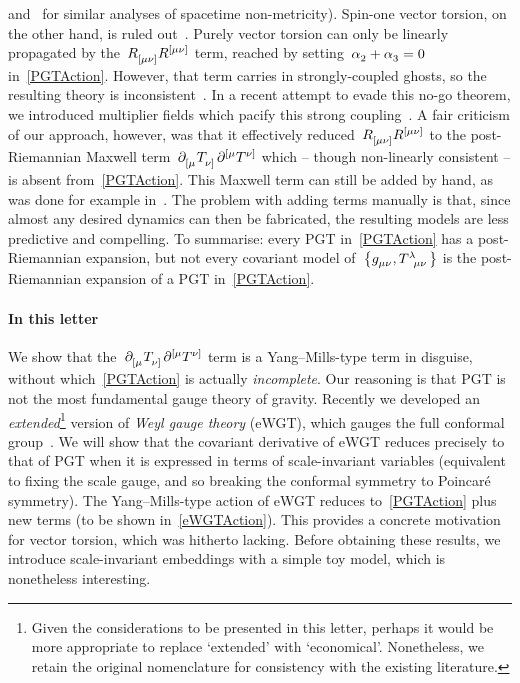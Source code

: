 \documentclass[aps,prd,reprint,preprintnumbers,showpacs,floatfix,nofootinbib,superscript address]{revtex4-2}
\begin{document}
and~\cite{BeltranJimenez:2019acz,BeltranJimenez:2019esp,Percacci:2020ddy,BeltranJimenez:2020sqf,Marzo:2021esg,Piva:2021nyj,Marzo:2021iok,Iosifidis:2021xdx,Jimenez-Cano:2022sds,Iosifidis:2023pvz} for similar analyses of spacetime non-metricity). Spin-one vector torsion, on the other hand, is ruled out~\cite{Yo:1999ex,Yo:2001sy}. Purely vector torsion can only be linearly propagated by the~$\MAGF{_{[\mu\nu]}}\MAGF{^{[\mu\nu]}}$ term, reached by setting~$\Alp{2}+\Alp{3}=0$ in~\cref{PGTAction}. However, that term carries in strongly-coupled ghosts, so the resulting theory is inconsistent~\cite{Yo:1999ex,Yo:2001sy}. In a recent attempt to evade this no-go theorem, we introduced multiplier fields which pacify this strong coupling~\cite{Barker:2023fem}. A fair criticism of our approach, however, was that it effectively reduced~$\MAGF{_{[\mu\nu]}}\MAGF{^{[\mu\nu]}}$ to the post-Riemannian Maxwell term~$\PD{_{[\mu}}\MAGT{_{\nu]}}\PD{^{[\mu}}\MAGT{^{\nu]}}$ which -- though non-linearly consistent -- is absent from~\cref{PGTAction}. This Maxwell term can still be added by hand, as was done for example in~\cite{Mikura:2023ruz}. The problem with adding terms manually is that, since almost any desired dynamics can then be fabricated, the resulting models are less predictive and compelling. To summarise: every PGT in~\cref{PGTAction} has a post-Riemannian expansion, but not every covariant model of~$\big\{\FieldG{_{\mu\nu}},\MAGT{^\lambda_{\mu\nu}}\big\}$ is the post-Riemannian expansion of a PGT in~\cref{PGTAction}.


\paragraph*{In this letter} We show that the~$\PD{_{[\mu}}\MAGT{_{\nu]}}\PD{^{[\mu}}\MAGT{^{\nu]}}$ term is a Yang--Mills-type term in disguise, without which~\cref{PGTAction} is actually \emph{incomplete}. Our reasoning is that PGT is not the most fundamental gauge theory of gravity. Recently we developed an \emph{extended}\footnote{Given the considerations to be presented in this letter, perhaps it would be more appropriate to replace `extended' with `economical'. Nonetheless, we retain the original nomenclature for consistency with the existing literature.} version of \emph{Weyl gauge theory} (eWGT), which gauges the full conformal group~\cite{Lasenby:2015dba,Hobson:2020bms,Hobson:2020doi,Hobson:2021iwy,Hobson:2023rdw}. We will show that the covariant derivative of eWGT reduces precisely to that of PGT when it is expressed in terms of scale-invariant variables (equivalent to fixing the scale gauge, and so breaking the conformal symmetry to Poincar\'e symmetry). The Yang--Mills-type action of eWGT reduces to~\cref{PGTAction} plus new terms (to be shown in~\cref{eWGTAction}). This provides a concrete motivation for vector torsion, which was hitherto lacking. Before obtaining these results, we introduce scale-invariant embeddings with a simple toy model, which is nonetheless interesting.
\end{document}
